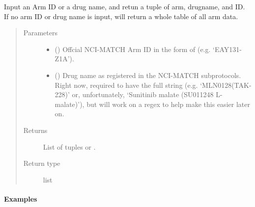 \documentclass[letterpaper,10pt,english]{sphinxmanual}
\begin{document}
\begin{fulllineitems}
\begin{fulllineitems}
\label{\detokenize{matchbox_api_utils:matchbox_api_utils.match_arms.TreatmentArms.map_drug_arm}}
Input an Arm ID or a drug name, and retun a tuple of arm, drugname, and
ID. If no arm ID or drug name is input, will return a whole table of all
arm data.
\begin{quote}\begin{description}
\item[{Parameters}] \leavevmode\begin{itemize}
\item {} 
 () \textendash{} Offcial NCI-MATCH Arm ID in the form of  (e.g.
‘EAY131-Z1A’).

\item {} 
 () \textendash{} Drug name as registered in the NCI-MATCH subprotocols.
Right now, required to have the full string (e.g. ‘MLN0128(TAK-228)’
or, unfortunately, ‘Sunitinib malate (SU011248 L-malate)’), but
will work on a regex to help make this easier later on.

\end{itemize}

\item[{Returns}] \leavevmode
List of tuples or .

\item[{Return type}] \leavevmode
list

\end{description}\end{quote}
\paragraph{Examples}

%
\begin{sphinxVerbatim}[commandchars=\\\{\}]
\end{sphinxVerbatim}


\end{fulllineitems}
\end{fulllineitems}
\end{document}
